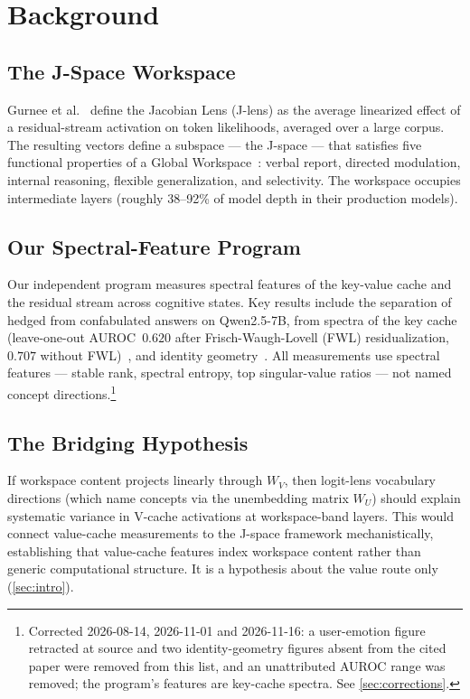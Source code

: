 \documentclass[11pt,a4paper]{article}
\begin{document}
\section{Background}
\label{sec:background}

\subsection{The J-Space Workspace}

Gurnee et al.~\citep{gurnee2026gwt} define the Jacobian Lens (J-lens)
as the average linearized effect of a residual-stream activation on
token likelihoods, averaged over a large corpus. The resulting vectors
define a subspace --- the J-space --- that satisfies five functional
properties of a Global Workspace~\citep{baars1988cognitive}: verbal
report, directed modulation, internal reasoning, flexible
generalization, and selectivity. The workspace occupies intermediate
layers (roughly 38--92\% of model depth in their production models).

\subsection{Our Spectral-Feature Program}

Our independent program measures spectral features of the key-value
cache and the residual stream across cognitive states. Key results
include the separation of hedged from confabulated answers on
Qwen2.5-7B, from spectra of the key cache (leave-one-out AUROC~$0.620$
after Frisch-Waugh-Lovell (FWL) residualization, $0.707$ without
FWL)~\citep{lyra2026oracle}, and identity
geometry~\citep{lyra2026identity}. All measurements use spectral
features --- stable rank, spectral entropy, top singular-value ratios
--- not named concept directions.\footnote{Corrected 2026-08-14,
2026-11-01 and 2026-11-16: a user-emotion figure retracted at source and
two identity-geometry figures absent from the cited paper were removed
from this list, and an unattributed AUROC range was removed; the
program's features are key-cache spectra. See \cref{sec:corrections}.}

\subsection{The Bridging Hypothesis}

If workspace content projects linearly through $W_V$, then logit-lens
vocabulary directions (which name concepts via the unembedding matrix
$W_U$) should explain systematic variance in V-cache activations at
workspace-band layers. This would connect value-cache measurements
to the J-space framework mechanistically, establishing that
value-cache features index workspace content rather than
generic computational structure. It is a hypothesis about the value
route only (\cref{sec:intro}).
\end{document}

